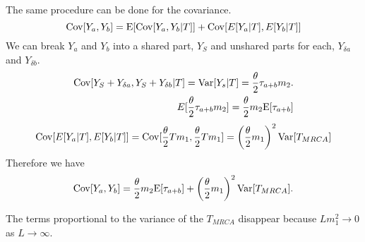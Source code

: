 The same procedure can be done for the covariance.
\begin{equation*}
  \mathrm{Cov}[Y_a,Y_b] = \mathrm{E}[\mathrm{Cov}[Y_a,Y_b|T]] + \mathrm{Cov}[E[Y_a|T],E[Y_b|T]]
\end{equation*}
We can break $Y_a$ and $Y_b$ into a shared part, $Y_S$ and unshared parts for
each, $Y_{\delta a}$ and $Y_{\delta b}$.
\begin{align*}
  \mathrm{Cov}[Y_S + Y_{\delta a}, Y_S + Y_{\delta b}|T] = \mathrm{Var}[Y_s|T] = \frac{\theta}{2} \tau_{a+b} m_2.\\
  E[\frac{\theta}{2} \tau_{a+b} m_2] = \frac{\theta}{2} m_2\mathrm{E}[\tau_{a+b}]
\end{align*}
\begin{align*}
  \mathrm{Cov}[E[Y_a|T],E[Y_b|T]] = \mathrm{Cov}[\frac{\theta}{2} T m_1, \frac{\theta}{2} T m_1] = \left( \frac{\theta}{2} m_1 \right)^2\mathrm{Var}[T_{MRCA}]
\end{align*}
Therefore we have
\begin{equation}
  \mathrm{Cov}[Y_a,Y_b] = \frac{\theta}{2} m_2 \mathrm{E}[\tau_{a+b}] + \left( \frac{\theta}{2} m_1 \right)^2 \mathrm{Var}[T_{MRCA}].
\end{equation}

The terms proportional to the variance of the $T_{MRCA}$ disappear because
$Lm_1^2 \to 0$ as $L \to \infty$.


